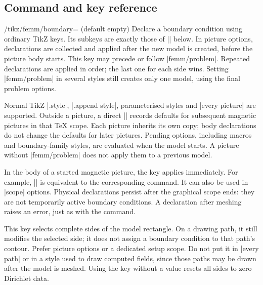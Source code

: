 \subsection{Command and key reference}
\begin{key}{/tikz/femm/boundary= (default \normalfont empty)}
Declare a boundary condition using ordinary TikZ keys. Its subkeys are
exactly those of |\femmboundary| below. In picture options, declarations
are collected and applied after the new model is created, before the
picture body starts. This key may precede or follow |femm/problem|.
Repeated declarations are applied in order; the last one for each side
wins. Setting |femm/problem| in several styles still creates only one
model, using the final problem options.

Normal TikZ |.style|, |.append style|, parameterised styles and
|every picture| are supported. Outside a picture, a direct
|\tikzset{femm/boundary=...}| records defaults for subsequent magnetic
pictures in that TeX scope. Each picture inherits its own copy; body
declarations do not change the defaults for later pictures. Pending
options, including macros and boundary-family styles, are evaluated
when the model starts. A picture without |femm/problem| does not apply
them to a previous model.

In the body of a started magnetic picture, the key applies immediately.
For example, || is equivalent
to the corresponding command. It can also be used in |scope| options.
Physical declarations persist after the graphical scope ends: they are
not temporarily active boundary conditions. A declaration after meshing
raises an error, just as with the command.

This key selects complete sides of the model rectangle. On a drawing
path, it still modifies the selected side; it does not assign a boundary
condition to that path's contour. Prefer picture options or a dedicated
setup scope. Do not put it in |every path| or in a style used to draw
computed fields, since those paths may be drawn after the model is meshed.
Using the key without a value resets all sides to zero Dirichlet data.
\end{key}

\begin{codeexample}
\begin{tikzpicture}[half model,
  femm/problem={xmin=0,xmax=85,ymin=-75,ymax=95,mesh size=4}]
\end{tikzpicture}
\end{codeexample}

